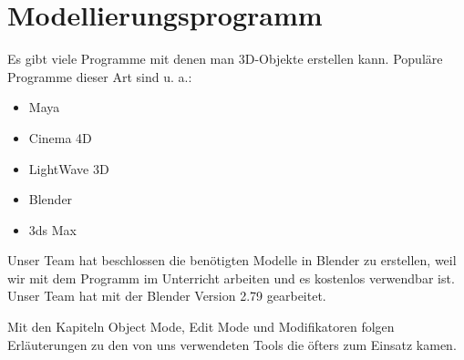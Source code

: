 \section{Modellierungsprogramm}
Es gibt viele Programme mit denen man 3D-Objekte erstellen kann.\citep{wiki:modellierungsprogramm_beispiele}
Populäre Programme dieser Art sind u. a.:

\begin{itemize}
    \item Maya
    \item Cinema 4D
    \item LightWave 3D
    \item Blender
    \item 3ds Max
\end{itemize}

Unser Team hat beschlossen die benötigten Modelle in Blender zu erstellen, weil wir mit dem Programm im Unterricht arbeiten und
es kostenlos verwendbar ist. Unser Team hat mit der Blender Version 2.79 gearbeitet.

Mit den Kapiteln Object Mode, Edit Mode und Modifikatoren folgen Erläuterungen zu
den von uns verwendeten Tools die öfters zum Einsatz kamen.
